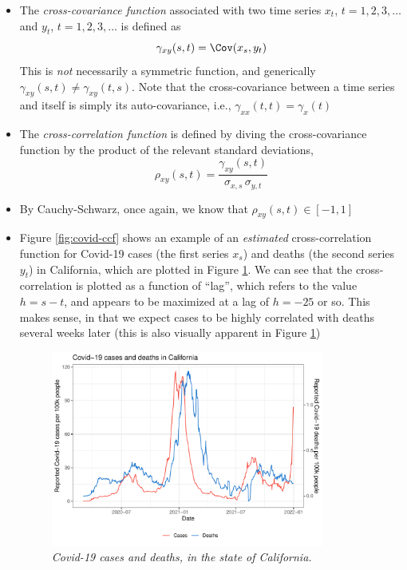 \documentclass{article}
\begin{document}
\begin{itemize}
\item The \emph{cross-covariance function} associated with two time series $x_t$, 
  $t = 1,2,3,\dots$ and $y_t$, $t = 1,2,3,\dots$ is defined as
  \[
  \gamma_{xy}(s,t) = \Cov(x_s, y_t)
  \]
  This is \emph{not} necessarily a symmetric function, and generically
  $\gamma_{xy}(s,t) \not= \gamma_{xy}(t,s)$. Note that the cross-covariance
  between a time series and itself is simply its auto-covariance, i.e.,
  $\gamma_{xx}(t,t) = \gamma_x(t)$

\item The \emph{cross-correlation function} is defined by diving the
  cross-covariance function by the product of the relevant standard deviations, 
  \[
  \rho_{xy}(s,t) = \frac{\gamma_{xy}(s,t)}{\sigma_{x,s} \, \sigma_{y,t}}
  \]

\item By Cauchy-Schwarz, once again, we know that $\rho_{xy}(s,t) \in [-1,1]$ 

\item Figure \ref{fig:covid-ccf} shows an example of an \emph{estimated} 
  cross-correlation function for Covid-19 cases (the first series $x_s$) and 
  deaths (the second series $y_t$) in California, which are plotted in Figure
  \ref{fig:covid-ts}. We can see that the cross-correlation is plotted as a
  function of ``lag'', which refers to the value $h = s-t$, and appears to be  
  maximized at a lag of $h = -25$ or so. This makes sense, in that we expect
  cases to be highly correlated with deaths several weeks later (this is also
  visually apparent in Figure \ref{fig:covid-ts})

\begin{figure}[p]
\centering
\includegraphics[width=0.85\textwidth]{fig/covid-1.pdf}
\caption{\it Covid-19 cases and deaths, in the state of California.}
\label{fig:covid-ts}


\end{figure}
\end{itemize}
\end{document}
